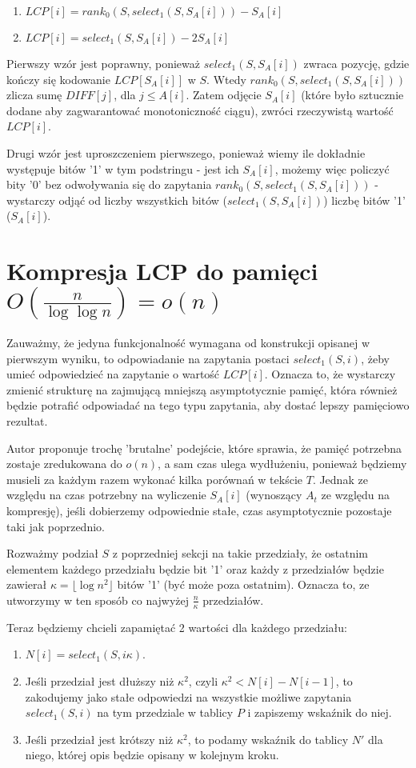 \documentclass{article}
\begin{document}
\begin{enumerate}
    \item $LCP[i] = rank_0(S, select_1(S, S_A[i])) - S_A[i]$
    \item $LCP[i] = select_1(S, S_A[i]) - 2S_A[i]$
\end{enumerate}

Pierwszy wzór jest poprawny, ponieważ $select_1(S, S_A[i])$ zwraca pozycję, gdzie kończy się kodowanie $LCP[S_A[i]]$ w $S$. Wtedy $rank_0(S, select_1(S, S_A[i]))$ zlicza sumę $DIFF[j]$, dla $j \le A[i]$. Zatem odjęcie $S_A[i]$ (które było sztucznie dodane aby zagwarantować monotoniczność ciągu), zwróci rzeczywistą wartość $LCP[i]$.

Drugi wzór jest uproszczeniem pierwszego, ponieważ wiemy ile dokładnie występuje bitów '1' w tym podstringu - jest ich $S_A[i]$, możemy więc policzyć bity '0' bez odwoływania się do zapytania $rank_0(S, select_1(S, S_A[i]))$ - wystarczy odjąć od liczby wszystkich bitów ($select_1(S, S_A[i])$) liczbę bitów '1' ($S_A[i]$).

\section{Kompresja LCP do pamięci $O(\frac{n}{\log{\log{n}}}) = o(n)$}

Zauważmy, że jedyna funkcjonalność wymagana od konstrukcji opisanej w pierwszym wyniku, to odpowiadanie na zapytania postaci $select_1(S, i)$, żeby umieć odpowiedzieć na zapytanie o wartość $LCP[i]$. Oznacza to, że wystarczy zmienić strukturę na zajmującą mniejszą asymptotycznie pamięć, która również będzie potrafić odpowiadać na tego typu zapytania, aby dostać lepszy pamięciowo rezultat.

Autor proponuje trochę 'brutalne' podejście, które sprawia, że pamięć potrzebna zostaje zredukowana do $o(n)$, a sam czas ulega wydłużeniu, ponieważ będziemy musieli za każdym razem wykonać kilka porównań w tekście $T$. Jednak ze względu na czas potrzebny na wyliczenie $S_A[i]$ (wynoszący $A_t$ ze względu na kompresję), jeśli dobierzemy odpowiednie stałe, czas asymptotycznie pozostaje taki jak poprzednio.

Rozważmy podział $S$ z poprzedniej sekcji na takie przedziały, że ostatnim elementem każdego przedziału będzie bit '1' oraz każdy z przedziałów będzie zawierał $\kappa = \lfloor \log{n}^2 \rfloor$ bitów '1' (być może poza ostatnim). Oznacza to, ze utworzymy w ten sposób co najwyżej $\frac{n}{\kappa}$ przedziałów.

Teraz będziemy chcieli zapamiętać 2 wartości dla każdego przedziału:
\begin{enumerate}
    \item $N[i] = select_1(S, i\kappa)$.
    \item Jeśli przedział jest dłuższy niż $\kappa^2$, czyli $\kappa^2 < N[i] - N[i-1]$, to zakodujemy jako stałe odpowiedzi na wszystkie możliwe zapytania $select_1(S, i)$ na tym przedziale w tablicy $P$ i zapiszemy wskaźnik do niej.
    \item Jeśli przedział jest krótszy niż $\kappa^2$, to podamy wskaźnik do tablicy $N'$ dla niego, której opis będzie opisany w kolejnym kroku.
\end{enumerate}
\end{document}

